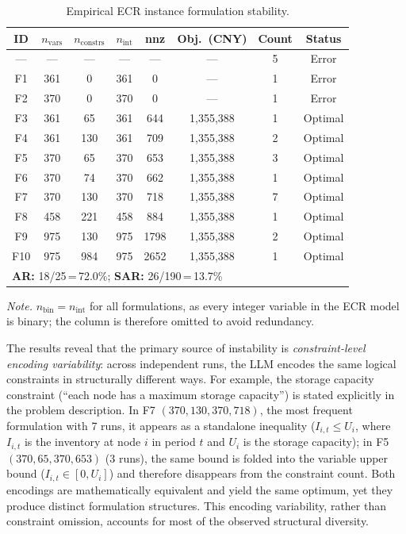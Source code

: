 \documentclass[preprint,12pt]{elsarticle}
\begin{document}
\begin{table}[!htbp]
 \centering
 \small
 \renewcommand{\arraystretch}{1.0}
 \caption{Empirical ECR instance formulation stability.}
 \label{tab:formulation_stability}
 \begin{threeparttable}
 \begin{tabular*}{\textwidth}{@{\extracolsep{\fill}}cccccccc@{}}
 \toprule
 ID & $n_{\text{vars}}$ & $n_{\text{constrs}}$ & $n_{\text{int}}$ & nnz & Obj.\ (CNY) & Count & Status \\
 \midrule
 --- & --- & --- & --- & --- & --- & 5 & Error \\
 F1 & 361 & 0 & 361 & 0 & --- & 1 & Error \\
 F2 & 370 & 0 & 370 & 0 & --- & 1 & Error \\
 F3 & 361 & 65 & 361 & 644 & 1,355,388 & 1 & Optimal \\
 F4 & 361 & 130 & 361 & 709 & 1,355,388 & 2 & Optimal \\
 F5 & 370 & 65 & 370 & 653 & 1,355,388 & 3 & Optimal \\
 F6 & 370 & 74 & 370 & 662 & 1,355,388 & 1 & Optimal \\
 F7 & 370 & 130 & 370 & 718 & 1,355,388 & 7 & Optimal \\
 F8 & 458 & 221 & 458 & 884 & 1,355,388 & 1 & Optimal \\
 F9 & 975 & 130 & 975 & 1798 & 1,355,388 & 2 & Optimal \\
 F10 & 975 & 984 & 975 & 2652 & 1,355,388 & 1 & Optimal \\
 \midrule
 \multicolumn{8}{l}{\textbf{AR:} 18/25\,=\,72.0\%; \textbf{SAR:} 26/190\,=\,13.7\%} \\
 \bottomrule
 \end{tabular*}
 \begin{tablenotes}[flushleft]
 \footnotesize
 \item \textit{Note.} $n_{\text{bin}}=n_{\text{int}}$ for all formulations, as every integer variable in the ECR model is binary; the column is therefore omitted to avoid redundancy.
 \end{tablenotes}
 \end{threeparttable}
\end{table}

The results reveal that the primary source of instability is \emph{constraint-level encoding variability}: across independent runs, the LLM encodes the same logical constraints in structurally different ways. For example, the storage capacity constraint (``each node has a maximum storage capacity'') is stated explicitly in the problem description. In F7 $(370, 130, 370, 718)$, the most frequent formulation with 7 runs, it appears as a standalone inequality ($I_{i,t} \leq U_i$, where $I_{i,t}$ is the inventory at node $i$ in period $t$ and $U_i$ is the storage capacity); in F5 $(370, 65, 370, 653)$ (3 runs), the same bound is folded into the variable upper bound ($I_{i,t} \in [0, U_i]$) and therefore disappears from the constraint count. Both encodings are mathematically equivalent and yield the same optimum, yet they produce distinct formulation structures. This encoding variability, rather than constraint omission, accounts for most of the observed structural diversity.
\end{document}
